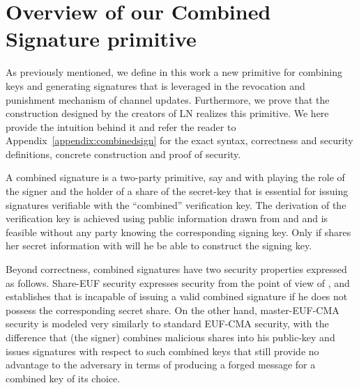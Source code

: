 \section{Overview of our Combined Signature primitive}
\label{sec:ov-combined-ds}
  As previously mentioned, we define in this work a new primitive for combining
  keys and generating signatures that is leveraged in the revocation and
  punishment mechanism of channel updates. Furthermore, we prove that the
  construction designed by the creators of LN realizes this primitive. We here
  provide the intuition behind it and refer the reader to
  Appendix~\ref{appendix:combinedsign} for the exact syntax, correctness and
  security definitions, concrete construction and proof of security.

  A combined signature is a two-party primitive, say \alice{} and \bob{} with
  \bob{} playing the role of the signer and \alice{} the holder of a share of
  the secret-key that is essential for issuing signatures verifiable with the
  ``combined'' verification key. The  derivation of the verification key is
  achieved  using public information drawn from  \alice{} and \bob and is
  feasible without any party knowing the corresponding signing key. Only if
  \alice{} shares her secret information with \bob{} will he be able to
  construct the signing key.

  Beyond correctness, combined signatures have two security properties expressed
  as follows. Share-EUF security expresses security from the point of view of
  \alice{}, and establishes that \bob{} is incapable of issuing a valid combined
  signature if he does not possess the corresponding secret share. On the other
  hand, master-EUF-CMA security is modeled very similarly to standard EUF-CMA
  security, with the difference that \bob{} (the signer) combines malicious
  shares into his public-key and issues signatures with respect to such combined
  keys that still provide no advantage to the adversary in terms of producing a
  forged message for a combined key of its choice.

